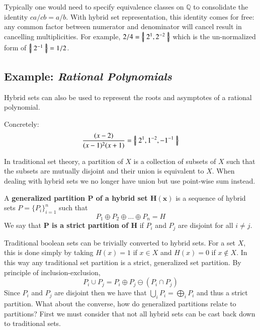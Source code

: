 Typically one would need to specify equivalence classes on $\mathbb{Q}$ to consolidate the identity $ca/cb = a/b$.
With hybrid set representation, this identity comes for free:
any common factor between numerator and denominator will cancel result in cancelling multiplicities. 
For example, $2/4 = \left\{ \! \left| \; 2^1, 2^{-2} \; \right| \! \right\}$ which is the un-normalized form of $\left\{ \! \left| \; 2^{-1} \; \right| \! \right\} = 1/2$.





\subsection{Example: \emph{Rational Polynomials}}

Hybrid sets can also be used to represent the roots and asymptotes of a rational polynomial.
\begin{example} Concretely: 
	\begin{equation}
		\frac{(x-2)}{(x-1)^2(x+1)} = \left\{ \! \left| \;  2^1, 1^{-2}, -1^{-1}  \; \right| \! \right\}
	\end{equation}
\end{example}

\newpage

In traditional set theory, a partition of $X$ is a collection of subsets of $X$ such that 
the subsets are mutually disjoint and their union is equivalent to $X$.
When dealing with hybrid sets we no longer have union but use point-wise sum instead.


\begin{definition}
	A \textbf{generalized partition $\boldsymbol{P}$ of a hybrid set $\boldsymbol{H(x)}$} is a sequence of hybrid sets
	$P=\{P_i \}_{i=1}^n$ such that
	\begin{equation}
		P_1 \oplus P_2 \oplus \ldots \oplus P_n = H
	\end{equation}
	We say that \textbf{$\boldsymbol{P}$ is a strict partition of $\boldsymbol{H}$} if 
	$P_i$ and $P_j$ are disjoint for all $i \neq j$.
\end{definition}


Traditional boolean sets can be trivially converted to hybrid sets.
For a set $X$, this is done simply by taking $H(x)=1$ if $x \in X$ and $H(x)=0$ if $x \notin X$.
In this way any traditional set partition is a strict, generalized set partition.
By principle of inclusion-exclusion, 
\begin{equation*}
	P_i \cup P_j = P_i \oplus P_j \ominus (P_i \cap P_j)
\end{equation*}
Since $P_i$ and $P_j$ are disjoint then we have that $\bigcup_i P_i = \bigoplus_i P_i$ and thus a strict partition.
What about the converse, how do generalized partitions relate to partitions?
First we must consider that not all hybrid sets can be cast back down to traditional sets.


